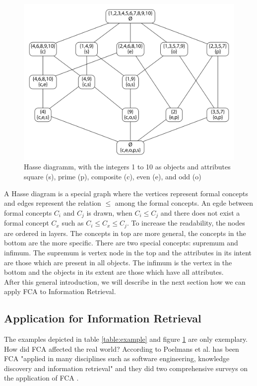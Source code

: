 \documentclass[11pt]{report}
\begin{document}
\begin{figure}[h]
\caption{Hasse diagramm, with the integers 1 to 10 as objects and attributes square (s), prime (p), composite (c), even (e), and odd (o)}
\label{figure:example}
	\centering
	\includegraphics[width=\linewidth]{./images/fcaExample}
\end{figure}

A Hasse diagram is a special graph where the vertices represent formal concepts and edges represent the relation $\le$ among the formal concepts. An egde between formal concepts $C_i$ and $C_j$ is drawn, when $C_i \le C_j$ and there does not exist a formal concept $C_x$ such as $C_i \le C_x \le C_j$. To increase the readability, the nodes are ordered in layers. The concepts in top are more general, the concepts in the bottom are the more specific. There are two special concepts: supremum and infimum. The supremum is vertex node in the top and the attributes in its intent are those which are present in all objects. The infimum is the vertex in the bottom and the objects in its extent are those which have all attributes. \\

After this general introduction, we will describe in the next section how we can apply FCA to Information Retrieval.

\subsection{Application for Information Retrieval}

The examples depicted in table \ref{table:example} and figure \ref{figure:example} are only exemplary. How did FCA affected the real world? According to Poelmans et al. has been FCA "applied in many disciplines such as software engineering, knowledge discovery and information retrieval" \cite{Poelmans2013} and they did two comprehensive surveys on the application of FCA \cite{Poelmans2013, Poelmans2013b}. \\
\end{document}
